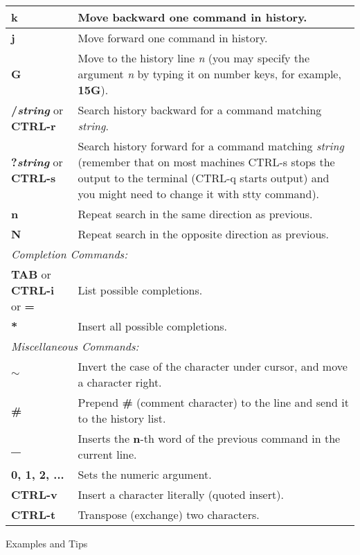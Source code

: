 \documentclass{article}
\begin{document}
\begin{tabular}{|p{4.5cm}|p{13cm}|}
\hline
\textbf{k} & Move backward one command in history. \\
\hline
\textbf{j} & Move forward one command in history. \\
\hline
\textbf{G} & Move to the history line \textit{n} (you may specify the argument \textit{n} by typing it on number keys, for example, \textbf{15G}). \\
\hline
\textbf{/\textit{string}} or \textbf{CTRL-r} & Search history backward for a command matching \textit{string}. \\
\hline
\textbf{?\textit{string}} or \textbf{CTRL-s} & Search history forward for a command matching \textit{string} (remember that on most machines CTRL-s stops the output to the terminal (CTRL-q starts output) and you might need to change it with stty command). \\
\hline
\textbf{n} & Repeat search in the same direction as previous. \\
\hline
\textbf{N} & Repeat search in the opposite direction as previous. \\
\hline
\multicolumn{2}{|l|}{\small\it{Completion Commands:}} \\
\hline
\textbf{TAB} or \textbf{CTRL-i} or \textbf{=} & List possible completions. \\
\hline
\textbf{*} & Insert all possible completions. \\
\hline
\multicolumn{2}{|l|}{\small\it{Miscellaneous Commands:}} \\
\hline
\textbf{$\sim$} & Invert the case of the character under cursor, and move a character right. \\
\hline
\textbf{\#} & Prepend \textbf{\#} (comment character) to the line and send it to the history list. \\
\hline
\textbf{\_} &  Inserts the \textbf{n}-th word of the previous command in the current line. \\
\hline
\textbf{0, 1, 2, ...} & Sets the numeric argument. \\
\hline
\textbf{CTRL-v} & Insert a character literally (quoted insert). \\
\hline
\textbf{CTRL-t} & Transpose (exchange) two characters. \\
\hline
\end{tabular}

\vspace{2mm}
\begin{center}
\large Examples and Tips
\end{center}
\end{document}
